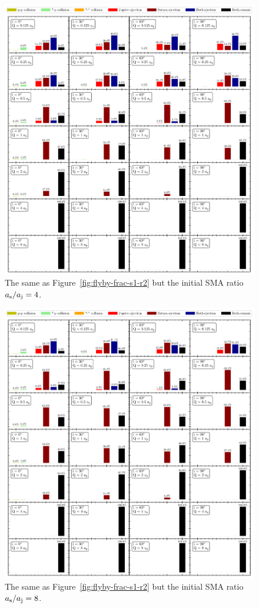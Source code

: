 \documentclass[twocolumn]{aastex63}
\newcommand*\fgr[1]{Figure~\ref{#1}}
\begin{document}
\begin{figure}
    \includegraphics[width=\textwidth]{figs/flyby-frac-s1-r4.pdf}
    \caption{The same as \fgr{fig:flyby-frac-s1-r2} but the initial SMA ratio $a_{\rm s}/a_{\rm j}=4$.}
    \label{fig:flyby-frac-s1-r4}
\end{figure}

\begin{figure}
    \includegraphics[width=\textwidth]{figs/flyby-frac-s1-r8.pdf}
    \caption{The same as \fgr{fig:flyby-frac-s1-r2} but the initial SMA ratio $a_{\rm s}/a_{\rm j}=8$.}
    \label{fig:flyby-frac-s1-r8}
\end{figure}
\end{document}
